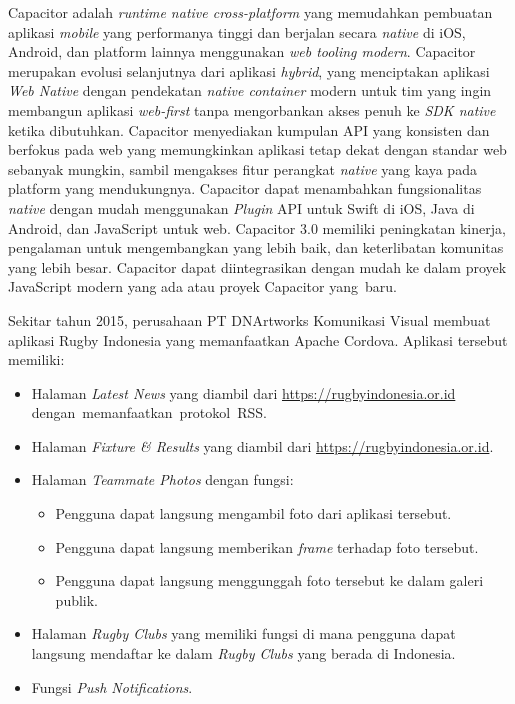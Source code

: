 \documentclass[a4paper,twoside]{article}
\begin{document}
Capacitor adalah \textit{runtime native cross-platform} yang memudahkan pembuatan aplikasi \textit{mobile} yang performanya tinggi dan berjalan secara \textit{native} di iOS, Android, dan platform lainnya menggunakan \textit{web tooling modern}. Capacitor merupakan evolusi selanjutnya dari aplikasi \textit{hybrid}, yang menciptakan aplikasi \textit{Web Native} dengan pendekatan \textit{native container} modern untuk tim yang ingin membangun aplikasi \textit{web-first} tanpa mengorbankan akses penuh ke \textit{SDK native} ketika dibutuhkan. Capacitor menyediakan kumpulan API yang konsisten dan berfokus pada web yang memungkinkan aplikasi tetap dekat dengan standar web sebanyak mungkin, sambil mengakses fitur perangkat \textit{native} yang kaya pada platform yang mendukungnya. Capacitor dapat menambahkan fungsionalitas \textit{native} dengan mudah menggunakan \textit{Plugin} API untuk Swift di iOS, Java di Android, dan JavaScript untuk web. Capacitor 3.0 memiliki peningkatan kinerja, pengalaman untuk mengembangkan yang lebih baik, dan keterlibatan komunitas yang lebih besar. Capacitor dapat diintegrasikan dengan mudah ke dalam proyek JavaScript modern yang ada atau proyek Capacitor yang~baru.

Sekitar tahun 2015, perusahaan PT DNArtworks Komunikasi Visual membuat aplikasi Rugby Indonesia yang memanfaatkan Apache Cordova. Aplikasi tersebut memiliki: 
\begin{itemize}
    \item Halaman \textit{Latest News} yang diambil dari \url{https://rugbyindonesia.or.id} dengan~memanfaatkan~protokol~RSS.
    \item Halaman \textit{Fixture \& Results} yang diambil dari \url{https://rugbyindonesia.or.id}.
    \item Halaman \textit{Teammate Photos} dengan fungsi:
    \begin{itemize}
        \item Pengguna dapat langsung mengambil foto dari aplikasi tersebut.
        \item Pengguna dapat langsung memberikan \textit{frame} terhadap foto tersebut.
        \item Pengguna dapat langsung menggunggah foto tersebut ke dalam galeri publik.
    \end{itemize}
    \item Halaman \textit{Rugby Clubs} yang memiliki fungsi di mana pengguna dapat langsung mendaftar ke dalam \textit{Rugby Clubs} yang berada di Indonesia.
    \item Fungsi \textit{Push Notifications}.
\end{itemize}
\end{document}
